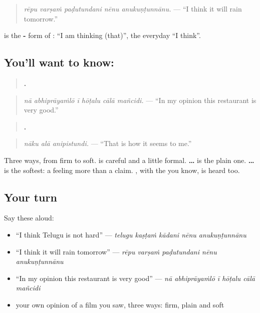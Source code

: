 \begin{quote}
\emph{rēpu varṣaṁ paḍutundani nēnu anukuṇṭunnānu.} — \textquotedblleft{}I think it will rain tomorrow.\textquotedblright{}
\end{quote}

\textbf{} is the \textbf{-} form of \textbf{}: \textquotedblleft{}I am thinking (that)\textquotedblright{}, the everyday \textquotedblleft{}I think\textquotedblright{}.

\subsection*{You'll want to know:  }
\begin{quote}
\textbf{     .}
\end{quote}

\begin{quote}
\emph{nā abhiprāyaṁlō ī hōṭalu cālā mañcidi.} — \textquotedblleft{}In my opinion this restaurant is very good.\textquotedblright{}
\end{quote}

\begin{quote}
\textbf{  .}
\end{quote}

\begin{quote}
\emph{nāku alā anipistundi.} — \textquotedblleft{}That is how it seems to me.\textquotedblright{}
\end{quote}

Three ways, from firm to soft. \textbf{ } is careful and a little formal. \textbf{…  } is the plain one. \textbf{ … } is the softest: a feeling more than a claim. \textbf{ }, with the \textbf{} you know, is heard too.

\subsection*{Your turn}
Say these aloud:

\begin{itemize}
\raggedright
  \item \textquotedblleft{}I think Telugu is not hard\textquotedblright{} — \emph{telugu kaṣṭaṁ kādani nēnu anukuṇṭunnānu}
  \item \textquotedblleft{}I think it will rain tomorrow\textquotedblright{} — \emph{rēpu varṣaṁ paḍutundani nēnu anukuṇṭunnānu}
  \item \textquotedblleft{}In my opinion this restaurant is very good\textquotedblright{} — \emph{nā abhiprāyaṁlō ī hōṭalu cālā mañcidi}
  \item your own opinion of a film you saw, three ways: firm, plain and soft
\end{itemize}

